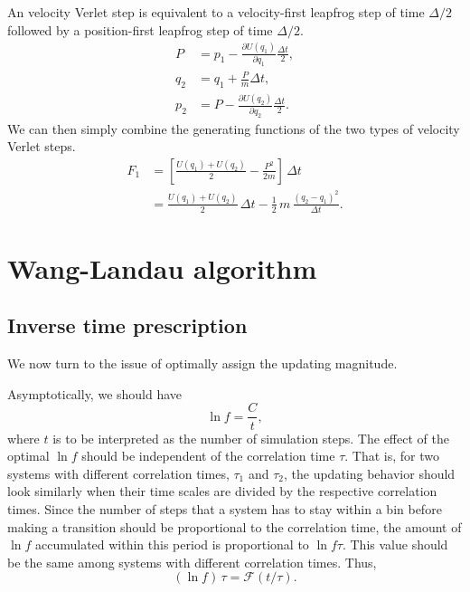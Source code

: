 \documentclass[aip,jcp,preprint,notitlepage, superscriptaddress]{revtex4-1}
\begin{document}
An velocity Verlet step is equivalent to
a velocity-first leapfrog step of time $\Delta/2$
followed by
a position-first leapfrog step of time $\Delta/2$.
%
\begin{equation}
\begin{aligned}
P     &= p_1 - \frac{ \partial U(q_1) } { \partial q_1 } \frac{ \Delta t }{ 2 }, \\
q_2   &= q_1 + \frac{P}{m} \Delta t, \\
p_2   &= P - \frac{ \partial U(q_2) } { \partial q_2 } \frac{ \Delta t } { 2 }.
\end{aligned}
\end{equation}
%
We can then simply combine the generating functions
of the two types of velocity Verlet steps.
$$
\begin{aligned}
F_1
&=
\left[
\frac{ U(q_1) + U(q_2) } { 2 }
- \frac{ P^2 }{ 2 m }
\right] \, \Delta t \\
&=
\frac{ U(q_1) + U(q_2) } { 2 } \, \Delta t
- \frac{1}{2} \, m \, \frac{ (q_2 - q_1)^2 }{ \Delta t }.
\end{aligned}
$$



\section{Wang-Landau algorithm}



\subsection{Inverse time prescription}

We now turn to the issue of optimally assign the updating magnitude.

Asymptotically, we should have
\begin{equation}
\ln f = \frac{C}{t},
\label{eq:lnfinvt}
\end{equation}
where $t$ is to be interpreted as the number of simulation steps.
%
The effect of the optimal $\ln f$ should be independent of the correlation time $\tau$.
That is, for two systems with different correlation times, $\tau_1$ and $\tau_2$,
the updating behavior should look similarly
when their time scales are divided by the respective correlation times.
%
Since the number of steps that a system has to stay within a bin before making a transition
should be proportional to the correlation time,
the amount of $\ln f$ accumulated within this period
is proportional to $\ln f \tau$.
%
This value should be the same among systems with different correlation times.
%
Thus,
\begin{equation}
  (\ln f) \, \tau = \mathcal F(t/\tau).
\label{eq:lnf_general}
\end{equation}
\end{document}
